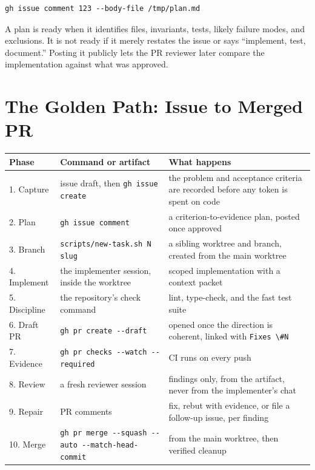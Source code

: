 \documentclass[11pt]{article}
\newcommand{\co}[1]{\lstinline[basicstyle=\ttfamily\color{gwInk}]{#1}}
\begin{document}
\begin{lstlisting}[style=gw]
gh issue comment 123 --body-file /tmp/plan.md
\end{lstlisting}

A plan is ready when it identifies files, invariants, tests, likely failure modes, and
exclusions. It is not ready if it merely restates the issue or says ``implement, test,
document.'' Posting it publicly lets the PR reviewer later compare the implementation against
what was approved.

\section{The Golden Path: Issue to Merged PR}

\begin{center}
\begin{tabularx}{\textwidth}{@{}l Y Y@{}}
\toprule
\textbf{Phase} & \textbf{Command or artifact} & \textbf{What happens} \\
. Capture & issue draft, then \co{gh issue create} & the problem and acceptance criteria are
  recorded before any token is spent on code \\
2. Plan & \co{gh issue comment} & a criterion-to-evidence plan, posted once approved \\
3. Branch & \co{scripts/new-task.sh N slug} & a sibling worktree and branch, created from the
  main worktree \\
4. Implement & the implementer session, inside the worktree & scoped implementation with a
  context packet \\
5. Discipline & the repository's check command & lint, type-check, and the fast test suite \\
6. Draft PR & \co{gh pr create --draft} & opened once the direction is coherent, linked with
  \co{Fixes \#N} \\
7. Evidence & \co{gh pr checks --watch --required} & CI runs on every push \\
8. Review & a fresh reviewer session & findings only, from the artifact, never from the
  implementer's chat \\
9. Repair & PR comments & fix, rebut with evidence, or file a follow-up issue, per finding \\
10. Merge & \co{gh pr merge --squash --auto --match-head-commit} & from the main worktree, then
  verified cleanup \\
\bottomrule
\end{tabularx}
\end{center}
\end{document}
